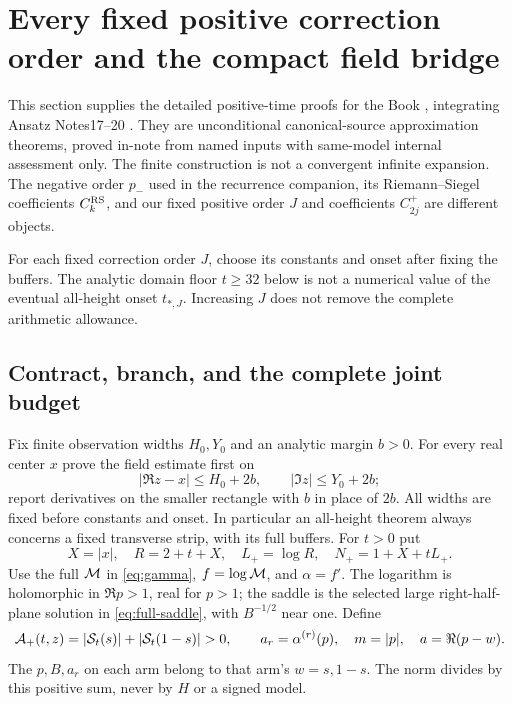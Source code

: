 \section{Every fixed positive correction order and the compact field bridge}
\label{sec:positive-hierarchy}
This section supplies the detailed positive-time proofs for the Book
\cite{book}, integrating Ansatz Notes17--20 \cite{ansatz17,ansatz18,ansatz19,ansatz20}.
They are unconditional canonical-source approximation theorems, proved
in-note from named inputs with same-model internal assessment only.
The finite construction is not a convergent infinite expansion. The
negative order $p_-$ used in the recurrence companion, its
Riemann--Siegel coefficients $C_k^{\rm RS}$, and our fixed positive
order $J$ and coefficients $C_{2j}^{+}$ are different objects.

For each fixed correction order $J$, choose its constants and onset
after fixing the buffers. The analytic domain floor $t\ge32$ below is
not a numerical value of the eventual all-height onset $t_{*,J}$.
Increasing $J$ does not remove the complete arithmetic allowance.

\subsection{Contract, branch, and the complete joint budget}
Fix finite observation widths $H_0,Y_0$ and an analytic margin $b>0$.
For every real center $x$ prove the field estimate first on
\[
 |\Re z-x|\le H_0+2b,\qquad |\Im z|\le Y_0+2b;
\]
report derivatives on the smaller rectangle with $b$ in place of $2b$.
All widths are fixed before constants and onset. In particular an
all-height theorem always concerns a fixed transverse strip, with
its full buffers. For $t>0$ put
\begin{equation}
 X=|x|,\quad R=2+t+X,\quad L_+=\log R,\quad N_+=1+X+tL_+.
 \label{eq:positive-scales}
\end{equation}
Use the full $\mathcal M$ in \eqref{eq:gamma}, $f=\log\mathcal M$, and
$\alpha=f'$. The logarithm is holomorphic in $\Re p>1$, real for
$p>1$; the saddle is the selected large right-half-plane solution in
\eqref{eq:full-saddle}, with $B^{-1/2}$ near one. Define
\begin{equation}
 \Acal_+(t,z)=|\Sc_t(s)|+|\Sc_t(1-s)|>0,\qquad
 a_r=\alpha^{(r)}(p),\quad m=|p|,\quad a=\Re(p-w).
 \label{eq:positive-envelope}
\end{equation}
The $p,B,a_r$ on each arm belong to that arm's $w=s,1-s$.
The norm divides by this positive sum, never by $H$ or a signed model.

